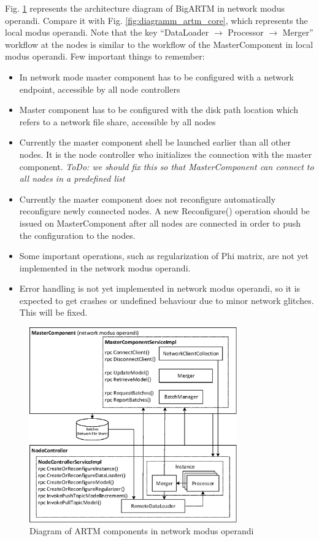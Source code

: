 \documentclass[11pt,a4paper,twoside]{report}
\begin{document}
Fig. \ref{fig:diagramm_artm_network} represents the architecture diagram of BigARTM in network modus operandi.
Compare it with Fig. \ref{fig:diagramm_artm_core}, which represents the local modus operandi.
Note that the key  ``DataLoader $\rightarrow$ Processor $\rightarrow$ Merger'' workflow
at the nodes is similar to the workflow of the MasterComponent in local modus operandi.
Few important things to remember:
\begin{itemize}
    \item In network mode master component has to be configured with a network endpoint,
          accessible by all node controllers
    \item Master component has to be configured with the disk path location which refers
          to a network file share, accessible by all nodes
    \item Currently the master component shell be launched earlier than all other nodes.
          It is the node controller who initializes the connection with the master component.
          \emph{ToDo: we should fix this so that MasterComponent can connect to all nodes in a predefined list}
    \item Currently the master component does not reconfigure automatically reconfigure newly connected nodes.
          A new Reconfigure() operation should be issued on MasterComponent
          after all nodes are connected in order to push the configuration to the nodes.
    \item Some important operations, such as regularization of Phi matrix,
          are not yet implemented in the network modus operandi.
    \item Error handling is not yet implemented in network modus operandi,
          so it is expected to get crashes or undefined behaviour due to minor network glitches.
          This will be fixed.
\end{itemize}

\begin{figure}[h!]
\begin{centering}
\includegraphics[height=84mm]{diagramm_artm_network.eps}
\caption{Diagram of ARTM components in network modus operandi}
\label{fig:diagramm_artm_network}
\end{centering}
\end{figure}
\vspace{1ex}
\end{document}
